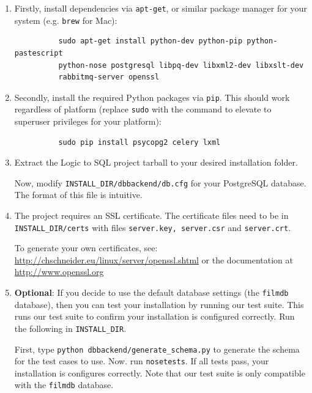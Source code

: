 \documentclass[a4paper, 11pt]{article}
\begin{document}
    \begin{enumerate}
      \item Firstly, install dependencies via \texttt{apt-get}, or similar
        package manager for your system (e.g. \texttt{brew} for Mac):
        \begin{verbatim}
          sudo apt-get install python-dev python-pip python-pastescript
          python-nose postgresql libpq-dev libxml2-dev libxslt-dev
          rabbitmq-server openssl
        \end{verbatim}

      \item Secondly, install the required Python packages via \texttt{pip}.
        This should work regardless of platform (replace \texttt{sudo} with the
        command to elevate to superuser privileges for your platform):
        \begin{verbatim}
          sudo pip install psycopg2 celery lxml
        \end{verbatim}

      \item Extract the Logic to SQL project tarball to your desired
        installation folder.

        Now, modify \texttt{INSTALL\_DIR/dbbackend/db.cfg} for your PostgreSQL
        database. The format of this file is intuitive.

      \item The project requires an SSL certificate. The certificate
        files need to be in \texttt{INSTALL\_DIR/certs} with files
        \texttt{server.key, server.csr} and \texttt{server.crt}.

        To generate your own certificates, see:\\
        \url{http://chschneider.eu/linux/server/openssl.shtml} or the
        documentation at \url{http://www.openssl.org}

      \item \textbf{Optional}: If you decide to use
        the default database settings (the \texttt{filmdb} database), then you
        can test your installation by running our test suite. This runs
        our test suite to confirm your installation is configured correctly.
        Run the following in \texttt{INSTALL\_DIR}.

        First, type \texttt{python dbbackend/generate\_schema.py} to generate
        the schema for the test cases to use. Now. run \texttt{nosetests}. If
        all tests pass, your installation is configures correctly. Note that
        our test suite is only compatible with the \texttt{filmdb} database.


\end{enumerate}
\end{document}
